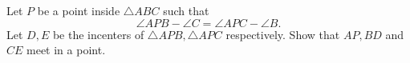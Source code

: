 Let $P$ be a point inside $\triangle ABC$ such that
\[ \angle APB - \angle C = \angle APC - \angle B. \]
Let $D, E$ be the incenters of $\triangle APB, \triangle APC$ respectively. Show that $AP, BD$ and $CE$ meet in a point.
